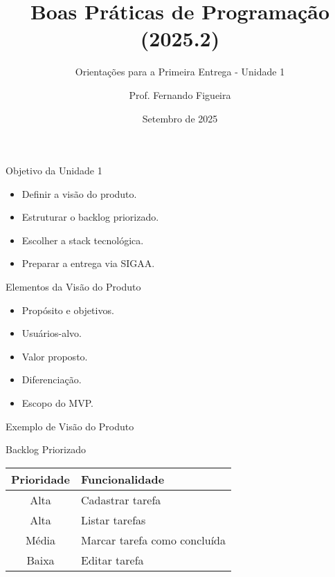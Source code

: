 \documentclass[10pt]{beamer}
\title{Boas Práticas de Programação (2025.2)}
\subtitle{Orientações para a Primeira Entrega - Unidade 1}
\author{Prof. Fernando Figueira}
\institute{DIMAp - UFRN}
\date{Setembro de 2025}
\begin{document}
\frame{\titlepage}

\begin{frame}{Objetivo da Unidade 1}
\begin{itemize}
    \item Definir a visão do produto.
    \item Estruturar o backlog priorizado.
    \item Escolher a stack tecnológica.
    \item Preparar a entrega via SIGAA.
\end{itemize}
\end{frame}

\begin{frame}{Elementos da Visão do Produto}
\begin{itemize}
    \item Propósito e objetivos.
    \item Usuários-alvo.
    \item Valor proposto.
    \item Diferenciação.
    \item Escopo do MVP.
\end{itemize}
\end{frame}

\begin{frame}{Exemplo de Visão do Produto}
\centering
{}
\end{frame}

\begin{frame}{Backlog Priorizado}
\centering
\begin{tabular}{|c|l|}
\hline
\textbf{Prioridade} & \textbf{Funcionalidade} \\
\hline
Alta & Cadastrar tarefa \\
Alta & Listar tarefas \\
Média & Marcar tarefa como concluída \\
Baixa & Editar tarefa \\
\hline
\end{tabular}
\end{frame}
\end{document}
